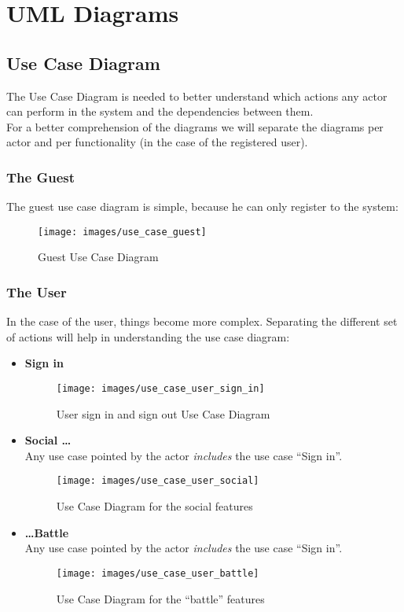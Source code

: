 \chapter{UML Diagrams}
	\section{Use Case Diagram}
	The Use Case Diagram is needed to better understand which actions any actor can perform in the  system and the dependencies between them.\\
	For a better comprehension of the diagrams we will separate the diagrams per actor and per functionality (in the case of the registered user).
\newpage
		\subsection{The Guest}
		The guest use case diagram is simple, because he can only register to the system:

		\begin{figure}[H]
			\centering
			\texttt{[image: images/use\_case\_guest]}
			\caption{Guest Use Case Diagram}
			\label{fig:use_case_guest}
		\end{figure}
\newpage
		\subsection{The User}
		In the case of the user, things become more complex. Separating the different set of actions will help in understanding the use case diagram:
		\begin{itemize}
		 	\item \textbf{Sign in}
			\begin{figure}[H]
				\centering
				\texttt{[image: images/use\_case\_user\_sign\_in]}
				\caption{User sign in and sign out Use Case Diagram}
				\label{fig:use_case_user_sign_in}
			\end{figure}
\newpage
			\item \textbf{Social \ldots} \hfill \\
			Any use case pointed by the actor \textit{includes} the use case ``Sign in''.
			\begin{figure}[H]
				\centering
				\texttt{[image: images/use\_case\_user\_social]}
				\caption{Use Case Diagram for the social features}
				\label{fig:use_case_user_social}
			\end{figure}
\newpage
			\item \textbf{\ldots Battle} \hfill \\
			Any use case pointed by the actor \textit{includes} the use case ``Sign in''.
			\begin{figure}[H]
				\centering
				\texttt{[image: images/use\_case\_user\_battle]}
				\caption{Use Case Diagram for the ``battle'' features}
				\label{fig:use_case_user_battle}
			\end{figure}
		\end{itemize} 
\newpage
